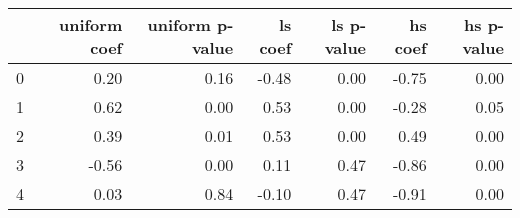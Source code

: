 \begin{tabular}{lrrrrrr}
\toprule
 & uniform coef & uniform p-value & ls coef & ls p-value & hs coef & hs p-value \\
\midrule
0 & 0.20 & 0.16 & -0.48 & 0.00 & -0.75 & 0.00 \\
1 & 0.62 & 0.00 & 0.53 & 0.00 & -0.28 & 0.05 \\
2 & 0.39 & 0.01 & 0.53 & 0.00 & 0.49 & 0.00 \\
3 & -0.56 & 0.00 & 0.11 & 0.47 & -0.86 & 0.00 \\
4 & 0.03 & 0.84 & -0.10 & 0.47 & -0.91 & 0.00 \\
\bottomrule
\end{tabular}
